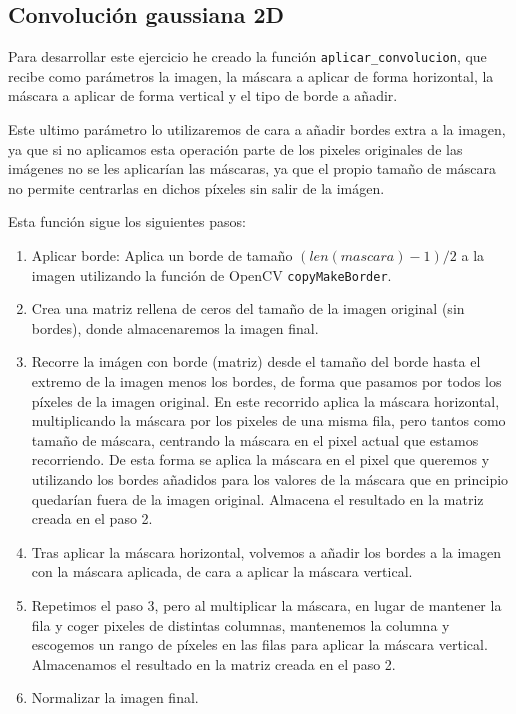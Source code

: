 \documentclass[12pt, spanish]{article}
\begin{document}
\subsection{Convolución gaussiana 2D}

Para desarrollar este ejercicio he creado la función \texttt{aplicar\_convolucion}, que recibe como parámetros la imagen, la máscara a aplicar de forma horizontal, la máscara a aplicar de forma vertical y el tipo de borde a añadir.

Este ultimo parámetro lo utilizaremos de cara a añadir bordes extra a la imagen\cite{bordertypes}, ya que si no aplicamos esta operación parte de los pixeles originales de las imágenes no se les aplicarían las máscaras, ya que el propio tamaño de máscara no permite centrarlas en dichos píxeles sin salir de la imágen.


Esta función sigue los siguientes pasos:

\begin{enumerate}
	\item Aplicar borde: Aplica un borde de tamaño $(len(mascara) - 1) / 2$ a la imagen utilizando la función de OpenCV \texttt{copyMakeBorder}\cite{copyborder}.
	\item Crea una matriz rellena de ceros del tamaño de la imagen original (sin bordes), donde almacenaremos la imagen final.
	\item Recorre la imágen con borde (matriz) desde el tamaño del borde hasta el extremo de la imagen menos los bordes, de forma que pasamos por todos los píxeles de la imagen original. En este recorrido aplica la máscara horizontal, multiplicando la máscara por los pixeles de una misma fila, pero tantos como tamaño de máscara, centrando la máscara en el pixel actual que estamos recorriendo. De esta forma se aplica la máscara en el pixel que queremos y utilizando los bordes añadidos para los valores de la máscara que en principio quedarían fuera de la imagen original. Almacena el resultado en la matriz creada en el paso 2.
	\item Tras aplicar la máscara horizontal, volvemos a añadir los bordes a la imagen con la máscara aplicada, de cara a aplicar la máscara vertical.
	\item Repetimos el paso 3, pero al multiplicar la máscara, en lugar de mantener la fila y coger pixeles de distintas columnas, mantenemos la columna y escogemos un rango de píxeles en las filas para aplicar la máscara vertical. Almacenamos el resultado en la matriz creada en el paso 2.
	\item Normalizar la imagen final.
\end{enumerate}
\end{document}
